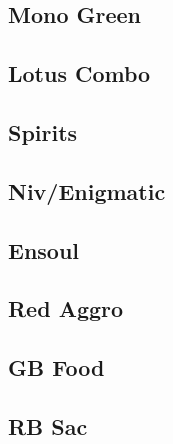 \documentclass[12pt]{article}
\begin{document}
\subsection{Mono Green}

\subsection{Lotus Combo}

\subsection{Spirits}

\subsection{Niv/Enigmatic}

\subsection{Ensoul}

\subsection{Red Aggro}

\subsection{GB Food}

\subsection{RB Sac}
\end{document}
